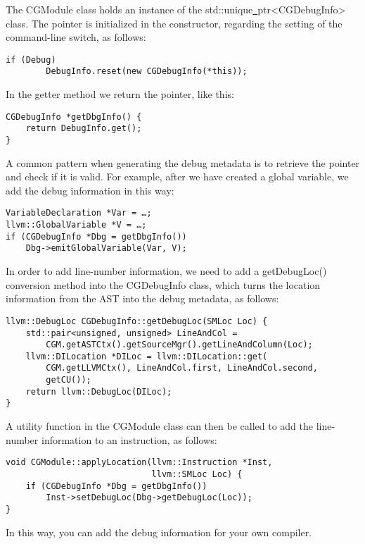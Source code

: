 The CGModule class holds an instance of the std::unique\underline{~}ptr<CGDebugInfo> class. The pointer is initialized in the constructor, regarding the setting of the command-line switch, as follows:\par

\begin{lstlisting}[caption={}]
	if (Debug)
		DebugInfo.reset(new CGDebugInfo(*this));
\end{lstlisting}

In the getter method we return the pointer, like this:\par

\begin{lstlisting}[caption={}]
CGDebugInfo *getDbgInfo() {
	return DebugInfo.get();
}
\end{lstlisting}

A common pattern when generating the debug metadata is to retrieve the pointer and check if it is valid. For example, after we have created a global variable, we add the debug information in this way:\par

\begin{lstlisting}[caption={}]
VariableDeclaration *Var = …;
llvm::GlobalVariable *V = …;
if (CGDebugInfo *Dbg = getDbgInfo())
	Dbg->emitGlobalVariable(Var, V);
\end{lstlisting}

In order to add line-number information, we need to add a getDebugLoc() conversion method into the CGDebugInfo class, which turns the location information from the AST into the debug metadata, as follows:\par

\begin{lstlisting}[caption={}]
llvm::DebugLoc CGDebugInfo::getDebugLoc(SMLoc Loc) {
	std::pair<unsigned, unsigned> LineAndCol =
		CGM.getASTCtx().getSourceMgr().getLineAndColumn(Loc);
	llvm::DILocation *DILoc = llvm::DILocation::get(
		CGM.getLLVMCtx(), LineAndCol.first, LineAndCol.second,
		getCU());
	return llvm::DebugLoc(DILoc);
}
\end{lstlisting}

A utility function in the CGModule class can then be called to add the line-number information to an instruction, as follows:\par

\begin{lstlisting}[caption={}]
void CGModule::applyLocation(llvm::Instruction *Inst,
							 llvm::SMLoc Loc) {
	if (CGDebugInfo *Dbg = getDbgInfo())
		Inst->setDebugLoc(Dbg->getDebugLoc(Loc));
}
\end{lstlisting}

In this way, you can add the debug information for your own compiler.\par

